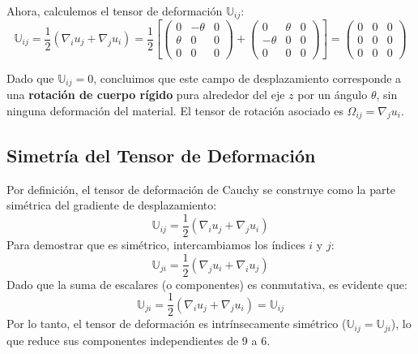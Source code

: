 Ahora, calculemos el tensor de deformación $\mathbb{U}_{ij}$:
$$ \mathbb{U}_{ij} = \frac{1}{2}(\nabla_i u_j + \nabla_j u_i) = \frac{1}{2} \left[ \begin{pmatrix} 0 & -\theta & 0 \\ \theta & 0 & 0 \\ 0 & 0 & 0 \end{pmatrix} + \begin{pmatrix} 0 & \theta & 0 \\ -\theta & 0 & 0 \\ 0 & 0 & 0 \end{pmatrix} \right] = \begin{pmatrix} 0 & 0 & 0 \\ 0 & 0 & 0 \\ 0 & 0 & 0 \end{pmatrix} $$

Dado que $\mathbb{U}_{ij} = 0$, concluimos que este campo de desplazamiento corresponde a una \textbf{rotación de cuerpo rígido} pura alrededor del eje $z$ por un ángulo $\theta$, sin ninguna deformación del material. El tensor de rotación asociado es $\Omega_{ij} = \nabla_j u_i$.

\subsection{Simetría del Tensor de Deformación}

Por definición, el tensor de deformación de Cauchy se construye como la parte simétrica del gradiente de desplazamiento:
$$ \mathbb{U}_{ij} = \frac{1}{2}(\nabla_i u_j + \nabla_j u_i) $$
Para demostrar que es simétrico, intercambiamos los índices $i$ y $j$:
$$ \mathbb{U}_{ji} = \frac{1}{2}(\nabla_j u_i + \nabla_i u_j) $$
Dado que la suma de escalares (o componentes) es conmutativa, es evidente que:
$$ \mathbb{U}_{ji} = \frac{1}{2}(\nabla_i u_j + \nabla_j u_i) = \mathbb{U}_{ij} $$
Por lo tanto, el tensor de deformación es intrínsecamente simétrico ($\mathbb{U}_{ij} = \mathbb{U}_{ji}$), lo que reduce sus componentes independientes de 9 a 6.


